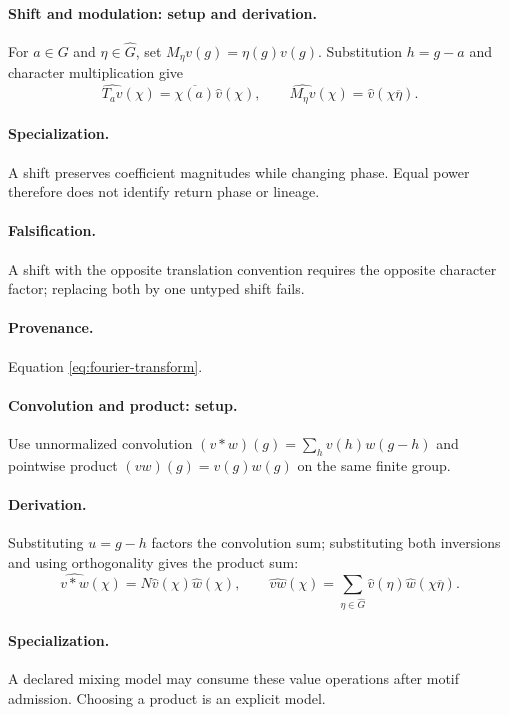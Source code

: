\paragraph{Shift and modulation: setup and derivation.}
For \(a\in G\) and \(\eta\in\widehat G\), set \(M_\eta v(g)=\eta(g)v(g)\).
Substitution \(h=g-a\) and character multiplication give
\begin{equation}
\widehat{T_a v}(\chi)=\overline{\chi(a)}\widehat v(\chi),
\qquad \widehat{M_\eta v}(\chi)=\widehat v(\chi\overline\eta).
\label{eq:fourier-shift-modulation}
\end{equation}
\paragraph{Specialization.} A shift preserves coefficient magnitudes while
changing phase. Equal power therefore does not identify return phase or lineage.
\paragraph{Falsification.} A shift with the opposite translation convention
requires the opposite character factor; replacing both by one untyped shift fails.
\paragraph{Provenance.} Equation \eqref{eq:fourier-transform}.

\paragraph{Convolution and product: setup.}
Use unnormalized convolution \((v*w)(g)=\sum_h v(h)w(g-h)\) and pointwise
product \((vw)(g)=v(g)w(g)\) on the same finite group.
\paragraph{Derivation.} Substituting \(u=g-h\) factors the convolution sum;
substituting both inversions and using orthogonality gives the product sum:
\begin{equation}
\widehat{v*w}(\chi)=N\widehat v(\chi)\widehat w(\chi),\qquad
\widehat{vw}(\chi)=\sum_{\eta\in\widehat G}
\widehat v(\eta)\widehat w(\chi\overline\eta).
\label{eq:fourier-convolution-product}
\end{equation}
\paragraph{Specialization.} A declared mixing model may consume these value
operations after motif admission. Choosing a product is an explicit model.
